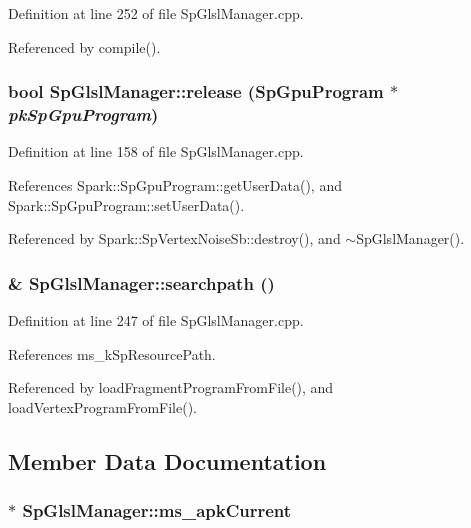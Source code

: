 Definition at line 252 of file Sp\-Glsl\-Manager.cpp.

Referenced by compile().
\subsubsection{\setlength{\rightskip}{0pt plus 5cm}bool Sp\-Glsl\-Manager::release ({\bf Sp\-Gpu\-Program} $\ast$ {\em pk\-Sp\-Gpu\-Program})\hspace{0.3cm}{\tt  [static]}}\label{classSpark_1_1SpGlslManager_e4}


Definition at line 158 of file Sp\-Glsl\-Manager.cpp.

References Spark::Sp\-Gpu\-Program::get\-User\-Data(), and Spark::Sp\-Gpu\-Program::set\-User\-Data().

Referenced by Spark::Sp\-Vertex\-Noise\-Sb::destroy(), and $\sim$Sp\-Glsl\-Manager().
\subsubsection{ \& Sp\-Glsl\-Manager::searchpath ()\hspace{0.3cm}{\tt  [static]}}\label{classSpark_1_1SpGlslManager_e10}


Definition at line 247 of file Sp\-Glsl\-Manager.cpp.

References ms\_\-k\-Sp\-Resource\-Path.

Referenced by load\-Fragment\-Program\-From\-File(), and load\-Vertex\-Program\-From\-File().

\subsection{Member Data Documentation}
\subsubsection{ $\ast$ {\bf Sp\-Glsl\-Manager::ms\_\-apk\-Current}\hspace{0.3cm}{\tt  [static, protected]}}\label{classSpark_1_1SpGlslManager_t1}


